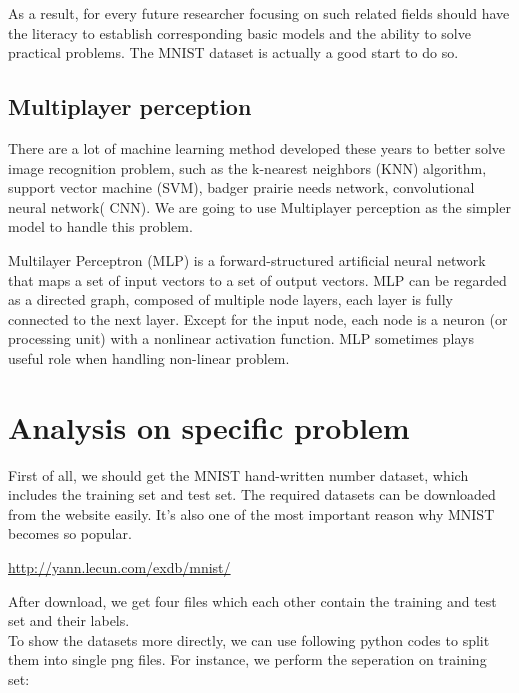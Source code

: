 \documentclass{article}
\begin{document}
As a result, for every future researcher focusing on such related fields should have the literacy to establish corresponding basic models and the ability to solve practical problems. The MNIST dataset is actually a good start to do so.

\subsection{Multiplayer perception}
There are a lot of machine learning method developed these years to better solve image recognition problem, such as the k-nearest neighbors (KNN) algorithm,  support vector machine (SVM), badger prairie needs network, convolutional neural network( CNN). We are going to use Multiplayer perception as the simpler model to handle this problem.

Multilayer Perceptron (MLP) is a forward-structured artificial neural network that maps a set of input vectors to a set of output vectors. 
MLP can be regarded as a directed graph, composed of multiple node layers, each layer is fully connected to the next layer. 
Except for the input node, each node is a neuron (or processing unit) with a nonlinear activation function.
MLP sometimes plays useful role when handling non-linear problem.

\section{Analysis on specific problem}
\label{gen_inst}

First of all, we should get the MNIST hand-written number dataset, which includes the training set and test set. 
The required datasets can be downloaded from the website easily. It's also one of the most important reason why MNIST becomes so popular.
\begin{center}
	\url{http://yann.lecun.com/exdb/mnist/}
\end{center}

After download, we get four files which each other contain the training and test set and their labels.\\

To show the datasets more directly, we can use following python codes to split them into single png files. For instance, we perform the seperation on training set:\\
\end{document}
